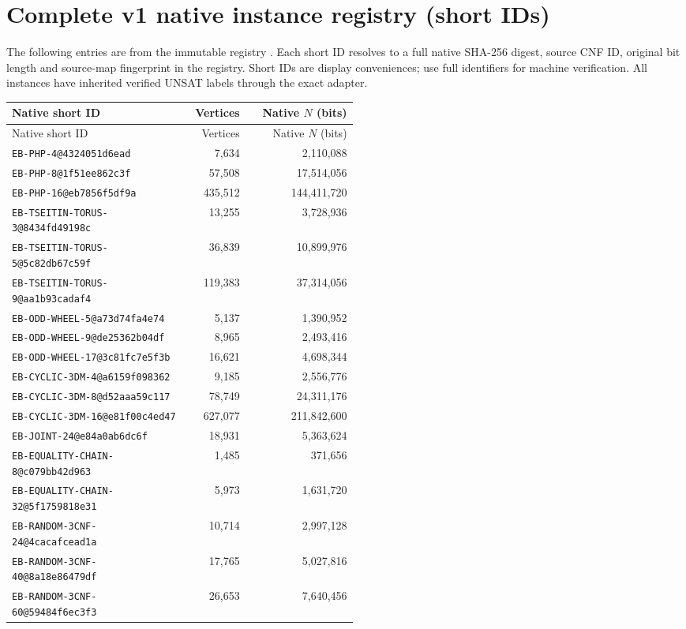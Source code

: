 \documentclass[11pt,letterpaper]{article}
\theoremstyle{definition}
\newcommand{\id}[1]{\nolinkurl{#1}}
\begin{document}
\clearpage
\appendix
\section{Complete v1 native instance registry (short IDs)}\label{app:registry}
The following entries are from the immutable registry \cite{registry}. Each short ID resolves to a full native SHA-256 digest, source CNF ID, original bit length and source-map fingerprint in the registry. Short IDs are display conveniences; use full identifiers for machine verification. All instances have inherited verified UNSAT labels through the exact adapter.
\begingroup\small
\begin{longtable}{@{}L{0.51\linewidth}rr@{}}
\toprule
Native short ID & Vertices & Native $N$ (bits) \\
\midrule
\endfirsthead
\toprule
Native short ID & Vertices & Native $N$ (bits) \\
\midrule
\endhead
\bottomrule
\endfoot
\id{EB-PHP-4@4324051d6ead} & 7,634 & 2,110,088 \\
\id{EB-PHP-8@1f51ee862c3f} & 57,508 & 17,514,056 \\
\id{EB-PHP-16@eb7856f5df9a} & 435,512 & 144,411,720 \\
\id{EB-TSEITIN-TORUS-3@8434fd49198c} & 13,255 & 3,728,936 \\
\id{EB-TSEITIN-TORUS-5@5c82db67c59f} & 36,839 & 10,899,976 \\
\id{EB-TSEITIN-TORUS-9@aa1b93cadaf4} & 119,383 & 37,314,056 \\
\id{EB-ODD-WHEEL-5@a73d74fa4e74} & 5,137 & 1,390,952 \\
\id{EB-ODD-WHEEL-9@de25362b04df} & 8,965 & 2,493,416 \\
\id{EB-ODD-WHEEL-17@3c81fc7e5f3b} & 16,621 & 4,698,344 \\
\id{EB-CYCLIC-3DM-4@a6159f098362} & 9,185 & 2,556,776 \\
\id{EB-CYCLIC-3DM-8@d52aaa59c117} & 78,749 & 24,311,176 \\
\id{EB-CYCLIC-3DM-16@e81f00c4ed47} & 627,077 & 211,842,600 \\
\id{EB-JOINT-24@e84a0ab6dc6f} & 18,931 & 5,363,624 \\
\id{EB-EQUALITY-CHAIN-8@c079bb42d963} & 1,485 & 371,656 \\
\id{EB-EQUALITY-CHAIN-32@5f1759818e31} & 5,973 & 1,631,720 \\
\id{EB-RANDOM-3CNF-24@4cacafcead1a} & 10,714 & 2,997,128 \\
\id{EB-RANDOM-3CNF-40@8a18e86479df} & 17,765 & 5,027,816 \\
\id{EB-RANDOM-3CNF-60@59484f6ec3f3} & 26,653 & 7,640,456 \\
\end{longtable}
\endgroup
\end{document}
